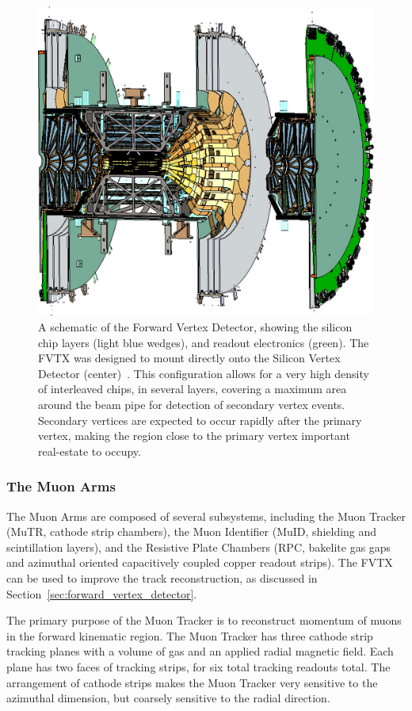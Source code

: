\begin{figure}[ht]
  \centering
  \includegraphics[width=0.6\linewidth]{./figures/forward_vertex_detector}
  \caption{
    A schematic of the Forward Vertex Detector, showing the silicon chip layers
    (light blue wedges), and readout electronics (green). The FVTX was designed
    to mount directly onto the Silicon Vertex Detector
    (center)~\cite{Aidala2014}.  This configuration allows for a very high
    density of interleaved chips, in several layers, covering a maximum area
    around the beam pipe for detection of secondary vertex events. Secondary
    vertices are expected to occur rapidly after the primary vertex, making the
    region close to the primary vertex important real-estate to occupy.
  } 
  \label{fig:forward_vertex_detector}
\end{figure}

\clearpage
\subsubsection{The Muon Arms}

The Muon Arms are composed of several subsystems, including the Muon Tracker
(MuTR, cathode strip chambers), the Muon Identifier (MuID, shielding and
scintillation layers), and the Resistive Plate Chambers (RPC, bakelite gas
gaps and azimuthal oriented capacitively coupled copper readout strips). The
FVTX can be used to improve the track reconstruction, as discussed in
Section~\ref{sec:forward_vertex_detector}. 

The primary purpose of the Muon Tracker is to reconstruct momentum of muons in
the forward kinematic region.  The Muon Tracker has three cathode strip tracking
planes with a volume of gas and an applied radial magnetic field.  Each plane
has two faces of tracking strips, for six total tracking readouts total. The
arrangement of cathode strips  makes the Muon Tracker very sensitive to the
azimuthal dimension, but coarsely sensitive to the radial direction.

